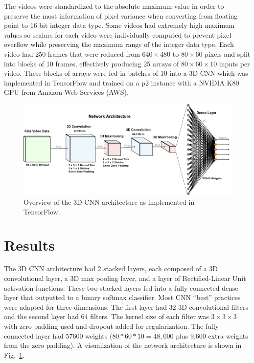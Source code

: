 The videos were standardized to the absolute maximum value in order to preserve the most information of pixel variance when converting from floating point to 16 bit integer data type. Some videos had extremely high maximum values so scalars for each video were individually computed to prevent pixel overflow while preserving the maximum range of the integer data type. Each video had 250 frames that were reduced from $640 \times 480$ to $80 \times 60$ pixels and split into blocks of 10 frames, effectively producing 25 arrays of $80 \times 60 \times 10$ inputs per video. These blocks of arrays were fed in batches of 10 into a 3D CNN which was implemented in TensorFlow and trained on a p2 instance with a NVIDIA K80 GPU from Amazon Web Services (AWS). 

\begin{figure}
\includegraphics[scale=1.2]{arch}
\caption{Overview of the 3D CNN architecture as implemented in TensorFlow.}
\label{fig:cnn}
\end{figure}

\section{Results}

The 3D CNN architecture had 2 stacked layers, each composed of a 3D convolutional layer, a 3D max pooling layer, and a layer of Rectified-Linear Unit \cite{nair2010rectified} activation functions. These two stacked layers fed into a fully connected dense layer that outputted to a binary softmax classifier. Most CNN ``best'' practices \cite{goodfellow_bengio_courville_2016} were adapted for three dimensions. The first layer had 32 3D convolutional filters and the second layer had 64 filters. The kernel size of each filter was $3 \times 3 \times 3$ with zero padding used and dropout \cite{srivastava2014dropout} added for regularization. The fully connected layer had 57600 weights ($80 * 60 * 10 = 48,000$ plus 9,600 extra weights from the zero padding). A visualization of the network architecture is shown in Fig.~\ref{fig:cnn}.

